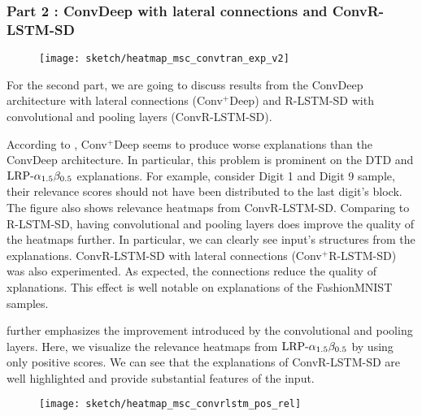 \subsubsection{Part 2 : ConvDeep with lateral connections and ConvR-LSTM-SD}
 \begin{figure}[!htb]
\centering
\texttt{[image: sketch/heatmap\_msc\_convtran\_exp\_v2]}
\label{fig:heatmap_msc_convtran_exp}
\end{figure}
For the second part, we are going to discuss results from the ConvDeep architecture with lateral connections (Conv$^+$Deep) and R-LSTM-SD with convolutional and pooling layers (ConvR-LSTM-SD).

According to \addfigure{\ref{fig:heatmap_msc_convtran_exp}}, Conv$^+$Deep seems to produce worse explanations than the ConvDeep architecture. In particular, this problem is prominent on the DTD and $\text{LRP-}\alpha_{1.5}\beta_{0.5}$ explanations. For example, consider Digit 1 and Digit 9 sample, their relevance scores should not have been distributed to the last digit's block. The figure also shows relevance heatmaps from ConvR-LSTM-SD. Comparing to R-LSTM-SD, having convolutional and pooling layers does improve  the quality of the heatmaps further. In particular, we can clearly see input's structures from the explanations.  ConvR-LSTM-SD with lateral connections (Conv$^+$R-LSTM-SD) was also experimented. As expected, the connections reduce the quality of xplanations. This effect is well notable on explanations of the FashionMNIST samples.

\addfigure{\ref{fig:heatmap_msc_convrlstm_pos_rel}} further emphasizes the improvement introduced by the convolutional and pooling layers. Here, we visualize the relevance heatmaps from $\text{LRP-}\alpha_{1.5}\beta_{0.5}$ by using only positive scores. We can see that the explanations of ConvR-LSTM-SD are well highlighted and provide substantial features of the input.



 \begin{figure}[!htb]
\centering
\texttt{[image: sketch/heatmap\_msc\_convrlstm\_pos\_rel]}
\label{fig:heatmap_msc_convrlstm_pos_rel}
\end{figure}

